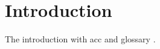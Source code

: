 \chapter{Introduction}
\label{chap:Introduction}

The introduction with \gls{acc} and \gls{glossary} \cite{b1}.
\clearpage